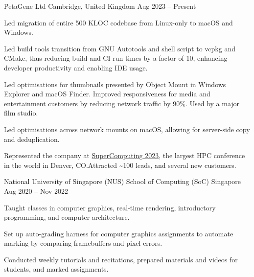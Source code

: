 \begin{cventries}
	{PetaGene Ltd} %
	{Cambridge, United Kingdom} %
	{Aug 2023 -- Present} %
	{
		\vspace{4.5mm}
		\begin{cvitems} %
			\item Led migration of entire 500 KLOC codebase from Linux-only to macOS and Windows.
			\item Led build tools transition from GNU Autotools and shell script to vcpkg and CMake, thus reducing build and CI run times by a factor of 10, enhancing developer productivity and enabling IDE usage.
			\item Led optimisations for thumbnails presented by Object Mount in Windows Explorer and macOS Finder. Improved responsiveness for media and entertainment customers by reducing network traffic by 90\%. Used by a major film studio.
			\item Led optimisations across network mounts on macOS, allowing for server-side copy and deduplication.
			\item Represented the company at \href{https://hallerickson.ungerboeck.com/prod/app85.cshtml?aat=5663535078317a434974474478437845326c2b766b2b4c562b355033396d433556704e2b3065744c5161773d&ExhibitorID=7040}{SuperComputing 2023}, the largest HPC conference in the world in Denver, CO.\@ Attracted \textasciitilde100 leads, and several new customers.
		\end{cvitems}
	}


	{National University of Singapore (NUS) School of Computing (SoC)} %
	{Singapore} %
	{Aug 2020 -- Nov 2022} %
	{
		\begin{cvitems} %
			\item Taught classes in computer graphics, real-time rendering, introductory programming, and computer architecture.
			\item Set up auto-grading harness for computer graphics assignments to automate marking by comparing framebuffers and pixel errors.
			\item Conducted weekly tutorials and recitations, prepared materials and videos for students, and marked assignments.
		\end{cvitems}
	}


\end{cventries}

